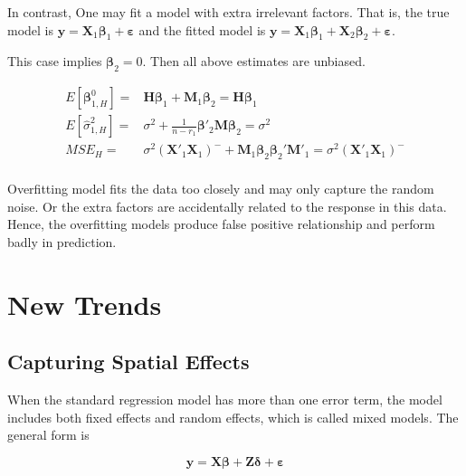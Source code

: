 \documentclass[
  11pt,
  openany]{memoir}
\begin{document}
In contrast, One may fit a model with extra irrelevant factors.
That is, the true model is \(\mathbf{y}=\mathbf{X}_1\boldsymbol\beta_1 + \boldsymbol\varepsilon\)
and the fitted model is \(\mathbf{y}=\mathbf{X}_1\boldsymbol\beta_1 + \mathbf{X}_2\boldsymbol\beta_2 + \boldsymbol\varepsilon\).

This case implies \(\boldsymbol\beta_2=0\). Then all above estimates are unbiased.

\begin{equation}
\begin{split}
E[\boldsymbol\beta^0_{1,H}]=&\mathbf{H}\boldsymbol\beta_1+\mathbf{M}_1\boldsymbol\beta_2=\mathbf{H}\boldsymbol\beta_1\\
E[\hat\sigma^2_{1,H}]=&\sigma^2 + \frac{1}{n-r_1}\boldsymbol\beta'_2\mathbf{M}\boldsymbol\beta_2=\sigma^2\\
MSE_{H}=&\sigma^2(\mathbf{X}'_1\mathbf{X}_1)^{-} + \mathbf{M}_1\boldsymbol\beta_2\boldsymbol\beta_2'\mathbf{M}'_1=\sigma^2(\mathbf{X}'_1\mathbf{X}_1)^{-}\\
\end{split}
\end{equation}

Overfitting model fits the data too closely and may only capture the random noise.
Or the extra factors are accidentally related to the response in this data.
Hence, the overfitting models produce false positive relationship and perform badly in prediction.

\pagebreak

\hypertarget{new-trends}{%
\chapter{New Trends}\label{new-trends}}

\hypertarget{capturing-spatial-effects}{%
\section{Capturing Spatial Effects}\label{capturing-spatial-effects}}

When the standard regression model has more than one error term, the model includes both fixed effects and random effects, which is called mixed models.
The general form is

\begin{equation}
\mathbf{y}=\mathbf{X}\boldsymbol{\beta}+\mathbf{Z}\boldsymbol{\delta}+\boldsymbol{\varepsilon}
\label{eq:mix}
\end{equation}
\end{document}
